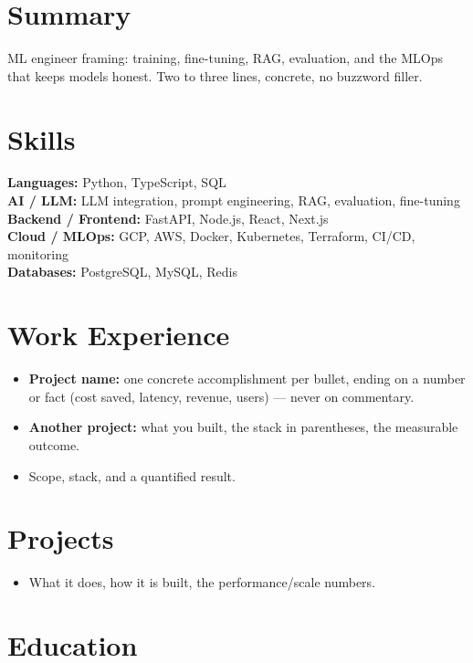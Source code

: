 \documentclass[10pt]{article}
\begin{document}

\section{Summary}
ML engineer framing: training, fine-tuning, RAG, evaluation, and the MLOps that keeps models honest. Two to three lines, concrete, no buzzword filler.

\section{Skills}
\textbf{Languages:} Python, TypeScript, SQL \\
\textbf{AI / LLM:} LLM integration, prompt engineering, RAG, evaluation, fine-tuning \\
\textbf{Backend / Frontend:} FastAPI, Node.js, React, Next.js \\
\textbf{Cloud / MLOps:} GCP, AWS, Docker, Kubernetes, Terraform, CI/CD, monitoring \\
\textbf{Databases:} PostgreSQL, MySQL, Redis

\section{Work Experience}
\begin{itemize}
  \item \textbf{Project name:} one concrete accomplishment per bullet, ending on a number or fact (cost saved, latency, revenue, users) --- never on commentary.
  \item \textbf{Another project:} what you built, the stack in parentheses, the measurable outcome.
\end{itemize}
\begin{itemize}
  \item Scope, stack, and a quantified result.
\end{itemize}

\section{Projects}
\begin{itemize}
  \item What it does, how it is built, the performance/scale numbers.
\end{itemize}

\section{Education}
\end{document}
